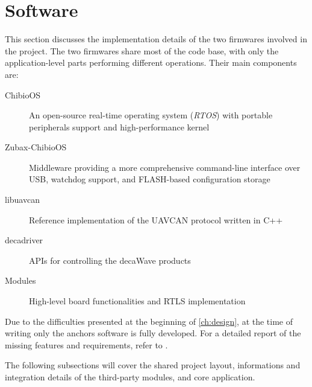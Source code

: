 \section{Software}\label{sec:software}

This section discusses the implementation details of the two firmwares involved in the project.
The two firmwares share most of the code base, with only the application-level parts performing different operations.
Their main components are:
\begin{description}
    \item[ChibioOS] An open-source real-time operating system (\emph{RTOS}) with portable peripherals support and high-performance kernel
    \item[Zubax-ChibioOS] Middleware providing a more comprehensive command-line interface over USB, watchdog support, and FLASH-based configuration storage
    \item[libuavcan] Reference implementation of the UAVCAN protocol written in C++
    \item[decadriver] APIs for controlling the decaWave products
    \item[Modules] High-level board functionalities and RTLS implementation
\end{description}





Due to the difficulties presented at the beginning of \autoref{ch:design}, at the time of writing only the anchors software is fully developed.
For a detailed report of the missing features and requirements, refer to .

The following subsections will cover the shared project layout, informations and integration details of the third-party modules, and core application.










